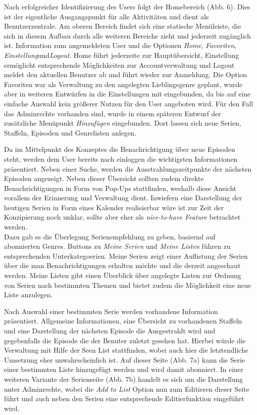 \documentclass[a4paper]{article}
\begin{document}
Nach erfolgreicher Identifizierung des Users folgt der Homebereich (Abb. 6). Dies ist der eigentliche Ausgangspunkt für alle Aktivitäten und dient als Benutzerzentrale. Am oberen Bereich findet sich eine statische Menüleiste, die sich in diesem Aufbau durch alle weiteren Bereiche zieht und jederzeit zugänglich ist. Information zum angemeldeten User und die Optionen \textit{Home}, \textit{Favoriten}, \textit{Einstellung}und\textit {Logout}. Home führt jederzeite zur Hauptübersicht, Einstellung ermöglicht entsprechende Möglichkeiten zur Accountverwaltung und Logout meldet den aktuellen Benutzer ab und führt wieder zur Anmeldung. Die Option Favoriten war als Verwaltung zu den angelegten Lieblingsgenre geplant, wurde aber in weiteren Entwürfen in die Einstellungen mit eingebunden, da bis auf eine einfache Auswahl kein größerer Nutzen für den User angeboten wird. Für den Fall das Adminrechte vorhanden sind, wurde in einem späteren Entwurf der zusätzliche Menüpunkt \textit{Hinzufügen} eingebunden. Dort lassen sich neue Serien, Staffeln, Episoden und Genrelisten anlegen. \\


\newpage 

Da im Mittelpunkt des Konzeptes die Benachrichtigung über neue Episoden steht, werden dem User bereits nach einloggen die wichtigsten Informationen präsentiert. Neben einer Suche, werden die Ausstrahlungszeitpunkte der nächsten Episoden angezeigt. Neben dieser Übersicht sollten zudem direkte Benachrichtigungen in Form von Pop-Ups stattfinden, weshalb diese Ansicht vorallem der Erinnerung und Verwaltung dient. Inwiefern eine Darstellung der heutigen Serien in Form eines Kalender realisierbar wäre ist zur Zeit der Konzipierung noch unklar, sollte aber eher als \textit{nice-to-have Feature} betrachtet werden.\\
Dazu gab es die Überlegung Serienempfehlung zu geben, basiernd auf abonnierten Genres. Buttons zu \textit{Meine Serien} und \textit{Meine Listen} führen zu entsprechenden Unterkategoerien.
Meine Serien zeigt einer Auflistung der Serien über die man Benachrichtigungen erhalten möchte und die derzeit angeschaut werden. Meine Listen gibt einen Überblick über angelegte Listen zur Ordnung von Serien nach bestimmten Themen und bietet zudem die Möglichkeit eine neue Liste anzulegen. \\

\parskip 12pt
\parindent 0pt

Nach Auswahl einer bestimmten Serie werden vorhandene Information präsentiert. Allgemeine Informationen, eine Übersicht zu vorhandenen Staffeln und eine Darstellung der nächsten Episode die Ausgestrahlt wird und gegebenfalls die Episode die der Benuter zuletzt gesehen hat. Hierbei würde die Verwaltung mit Hilfe der Seen List stattfinden, wobei auch hier die letztendliche Umsetzung eher unwahrscheinlich ist.
Auf dieser Seite (Abb. 7a) kann die Serie einer bestimmten Liste hinzugefügt werden und wird damit abonniert. In einer weiteren Variante der Serienseite (Abb. 7b) handelt es sich um die Darstellung unter Adminrechte, wobei die \textit{Add to List} Option nun zum Editieren dieser Seite führt und auch neben den Serien eine entsprechende Editierfunktion eingeführt wird. 
\end{document}
